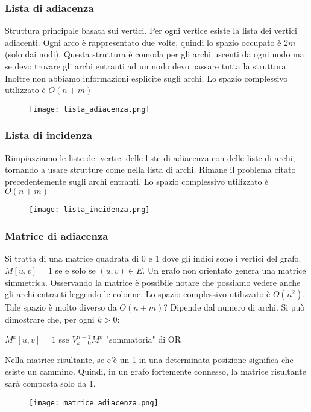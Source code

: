 \subsubsection{Lista di adiacenza}
Struttura principale basata sui vertici. Per ogni vertice esiste la lista dei vertici adiacenti.
Ogni arco è rappresentato due volte, quindi lo spazio occupato è $2m$ (solo dai nodi).
Questa struttura è comoda per gli archi uscenti da ogni nodo ma se devo trovare gli archi 
entranti ad un nodo devo passare tutta la struttura. Inoltre non abbiamo informazioni esplicite sugli archi.
Lo spazio complessivo utilizzato è $O(n+m)$
\begin{figure}[h]
    \texttt{[image: lista\_adiacenza.png]}
\end{figure}

\subsubsection{Lista di incidenza}
Rimpiazziamo le liste dei vertici delle liste di adiacenza con delle liste di archi,
tornando a usare strutture come nella lista di archi. Rimane il problema citato precedentemente 
sugli archi entranti.
Lo spazio complessivo utilizzato è $O(n+m)$
\begin{figure}[h]
    \texttt{[image: lista\_incidenza.png]}
\end{figure}
\clearpage

\subsubsection{Matrice di adiacenza}
Si tratta di una matrice quadrata di 0 e 1 dove gli indici sono i vertici del grafo.\\
$M[u,v] = 1$ se e solo se $(u, v) \in E$.
Un grafo non orientato genera una matrice simmetrica. Osservando la matrice 
è possibile notare che possiamo vedere anche gli archi entranti leggendo le colonne.
Lo spazio complessivo utilizzato è $O(n^2)$. Tale spazio è molto diverso da 
$O(n+m)$? Dipende dal numero di archi.
Si può dimostrare che, per ogni $k > 0$:
\begin{center}
    $M^k[u,v] = 1$ sse $V^{n-1}_{k=0}M^k$ "sommatoria" di OR
\end{center}
Nella matrice risultante, se c'è un 1 in una determinata posizione significa che esiste un cammino.
Quindi, in un grafo fortemente connesso, la matrice risultante sarà composta solo da 1.
\begin{figure}[h]
    \texttt{[image: matrice\_adiacenza.png]}
\end{figure}
\clearpage 

